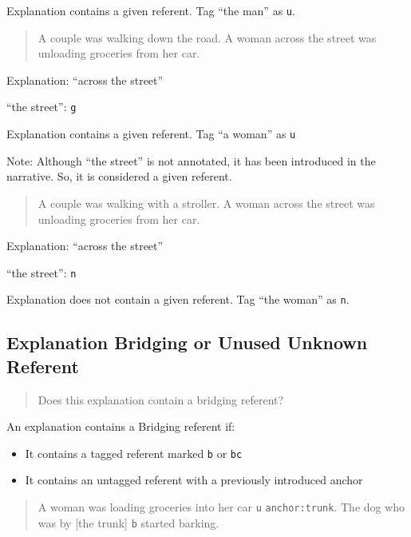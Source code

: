 \documentclass[
]{book}
\providecommand{\tightlist}{%
  \setlength{\itemsep}{0pt}\setlength{\parskip}{0pt}}
\begin{document}
Explanation contains a given referent.
Tag ``the man'' as \texttt{u}.

\begin{quote}
A couple was walking down the road.
A woman across the street was unloading groceries from her car.
\end{quote}

Explanation: ``across the street''

``the street'': \texttt{g}

Explanation contains a given referent.
Tag ``a woman'' as \texttt{u}

Note: Although ``the street'' is not annotated, it has been introduced in the narrative.
So, it is considered a given referent.

\begin{quote}
A couple was walking with a stroller.
A woman across the street was unloading groceries from her car.
\end{quote}

Explanation: ``across the street''

``the street'': \texttt{n}

Explanation does not contain a given referent.
Tag ``the woman'' as \texttt{n}.

\hypertarget{explanation-bridging-or-unused-unknown-referent}{%
\subsection{Explanation Bridging or Unused Unknown Referent}\label{explanation-bridging-or-unused-unknown-referent}}

\begin{quote}
Does this explanation contain a bridging referent?
\end{quote}

An explanation contains a Bridging referent if:

\begin{itemize}
\tightlist
\item
  It contains a tagged referent marked \texttt{b} or \texttt{bc}
\item
  It contains an untagged referent with a previously introduced anchor
\end{itemize}

\begin{quote}
A woman was loading groceries into her car \texttt{u} \texttt{anchor:trunk}.
The dog who was by {[}the trunk{]} \texttt{b} started barking.
\end{quote}
\end{document}
